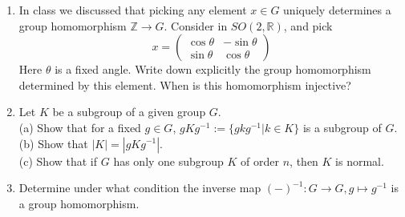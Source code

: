 \documentclass[12pt]{article}
\theoremstyle{plain}
\theoremstyle{definition}
\theoremstyle{remark}
\begin{document}
\begin{enumerate}
\item In class we discussed that picking any element $x\in G$ uniquely determines a group homomorphism $\mathbb{Z}\longrightarrow G$. Consider in $SO(2,\mathbb{R})$, and pick
    $$x=
    \left(
    \begin{array}{cc}
    \cos \theta &-\sin \theta\\
    \sin \theta & \cos \theta
    \end{array}
    \right)
    $$
   Here $\theta$ is a fixed angle. Write down explicitly the group homomorphism determined by this element. When is this homomorphism injective?
\item Let $K$ be a subgroup of a given group $G$.\\
(a) Show that for a fixed $g\in G$, $gKg^{-1}:=\{gkg^{-1}|k\in K\}$ is a subgroup of $G$.\\
(b) Show that $|K|=|gKg^{-1}|$.\\
(c) Show that if $G$ has only one subgroup $K$ of order $n$, then $K$ is normal.
\item Determine under what condition the inverse map $(-)^{-1}:G\longrightarrow G, g\mapsto g^{-1}$ is a group homomorphism.
\end{enumerate}
\end{document}
